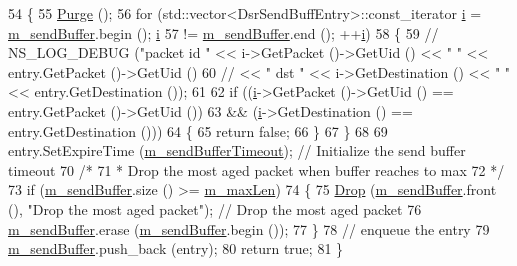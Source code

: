\begin{DoxyCode}
54 \{
55   \hyperlink{classns3_1_1dsr_1_1DsrSendBuffer_a4fc2bdaf29505ff9ec26f75b2e387e29}{Purge} ();
56   \textcolor{keywordflow}{for} (std::vector<DsrSendBuffEntry>::const\_iterator \hyperlink{bernuolliDistribution_8m_a6f6ccfcf58b31cb6412107d9d5281426}{i} = \hyperlink{classns3_1_1dsr_1_1DsrSendBuffer_a7ce6425b23f8949a515f5624031e5fd7}{m\_sendBuffer}.begin (); 
      \hyperlink{bernuolliDistribution_8m_a6f6ccfcf58b31cb6412107d9d5281426}{i}
57        != \hyperlink{classns3_1_1dsr_1_1DsrSendBuffer_a7ce6425b23f8949a515f5624031e5fd7}{m\_sendBuffer}.end (); ++\hyperlink{bernuolliDistribution_8m_a6f6ccfcf58b31cb6412107d9d5281426}{i})
58     \{
59 \textcolor{comment}{//      NS\_LOG\_DEBUG ("packet id " << i->GetPacket ()->GetUid () << " " << entry.GetPacket ()->GetUid ()}
60 \textcolor{comment}{//                                << " dst " << i->GetDestination () << " " << entry.GetDestination ());}
61 
62       \textcolor{keywordflow}{if} ((\hyperlink{bernuolliDistribution_8m_a6f6ccfcf58b31cb6412107d9d5281426}{i}->GetPacket ()->GetUid () == entry.GetPacket ()->GetUid ())
63           && (\hyperlink{bernuolliDistribution_8m_a6f6ccfcf58b31cb6412107d9d5281426}{i}->GetDestination () == entry.GetDestination ()))
64         \{
65           \textcolor{keywordflow}{return} \textcolor{keyword}{false};
66         \}
67     \}
68 
69   entry.SetExpireTime (\hyperlink{classns3_1_1dsr_1_1DsrSendBuffer_a69009e6cefeda83be7eada52fdc8680e}{m\_sendBufferTimeout});     \textcolor{comment}{// Initialize the send buffer timeout}
70   \textcolor{comment}{/*}
71 \textcolor{comment}{   * Drop the most aged packet when buffer reaches to max}
72 \textcolor{comment}{   */}
73   \textcolor{keywordflow}{if} (\hyperlink{classns3_1_1dsr_1_1DsrSendBuffer_a7ce6425b23f8949a515f5624031e5fd7}{m\_sendBuffer}.size () >= \hyperlink{classns3_1_1dsr_1_1DsrSendBuffer_ad42bfd04653608404029c7a2554fd963}{m\_maxLen})
74     \{
75       \hyperlink{classns3_1_1dsr_1_1DsrSendBuffer_ae076b4ebb909c5dc7deda45d905b8e97}{Drop} (\hyperlink{classns3_1_1dsr_1_1DsrSendBuffer_a7ce6425b23f8949a515f5624031e5fd7}{m\_sendBuffer}.front (), \textcolor{stringliteral}{"Drop the most aged packet"});         \textcolor{comment}{// Drop the most
       aged packet}
76       \hyperlink{classns3_1_1dsr_1_1DsrSendBuffer_a7ce6425b23f8949a515f5624031e5fd7}{m\_sendBuffer}.erase (\hyperlink{classns3_1_1dsr_1_1DsrSendBuffer_a7ce6425b23f8949a515f5624031e5fd7}{m\_sendBuffer}.begin ());
77     \}
78   \textcolor{comment}{// enqueue the entry}
79   \hyperlink{classns3_1_1dsr_1_1DsrSendBuffer_a7ce6425b23f8949a515f5624031e5fd7}{m\_sendBuffer}.push\_back (entry);
80   \textcolor{keywordflow}{return} \textcolor{keyword}{true};
81 \}
\end{DoxyCode}


